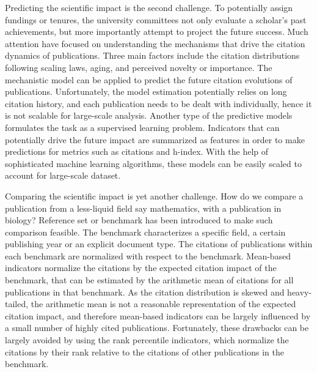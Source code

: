 Predicting the scientific impact is the second challenge. To potentially assign fundings or tenures, the university committees not only evaluate a scholar's past achievements, but more importantly attempt to project the future success. Much attention have focused on understanding the mechanisms that drive the citation dynamics of publications. Three main factors include the citation distributions following scaling laws\supercite{price1976general,barabasi1999emergence,peterson2010nonuniversal,Radicchi2008}, aging\supercite{barabasi1999emergence,albert2002statistical,hajra2006modelling,dorogovtsev2000evolution}, and perceived novelty or importance\supercite{Wang2013}. The mechanistic model can be applied to predict the future citation evolutions of publications\supercite{Wang2013}. Unfortunately, the model estimation potentially relies on long citation history\supercite{wang2014science,wang2014response}, and each publication needs to be dealt with individually, hence it is not scalable for large-scale analysis. Another type of the predictive models formulates the task as a supervised learning problem. Indicators that can potentially drive the future impact are summarized as features in order to make predictions for metrics such as citations\supercite{fu2008models,lokker2008prediction,ibanez2009predicting,mazloumian2012predicting,stern2014high,weihs2017learning} and h-index\supercite{hirsch2007does,acuna2012future,penner2013predictability,weihs2017learning}. With the help of sophisticated machine learning algorithms, these models can be easily scaled to account for large-scale dataset.

Comparing the scientific impact is yet another challenge. How do we compare a publication from a less-liquid field say mathematics, with a publication in biology? Reference set or benchmark has been introduced to make such comparison feasible\supercite{vinkler2010evaluation}. The benchmark characterizes a specific field, a certain publishing year or an explicit document type. The citations of publications within each benchmark are normalized with respect to the benchmark. Mean-based indicators normalize the citations by the expected citation impact of the benchmark, that can be estimated by the arithmetic mean of citations for all publications in that benchmark\supercite{schubert1986relative}. As the citation distribution is skewed and heavy-tailed, the arithmetic mean is not a reasonable representation of the expected citation impact, and therefore mean-based indicators can be largely influenced by a small number of highly cited publications. Fortunately, these drawbacks can be largely avoided by using the rank percentile indicators\supercite{bornmann2013use,mingers2015review,bornmann2019well}, which normalize the citations by their rank relative to the citations of other publications in the benchmark. 

